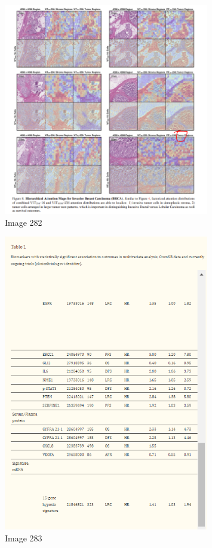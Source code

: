 \documentclass{article}%
\begin{document}
\begin{figure}[h!]%
\centering%
\includegraphics[width=0.8\textwidth]{images/image281.png}%
\caption{Image 282}%
\end{figure}

%


\begin{figure}[h!]%
\centering%
\includegraphics[width=0.8\textwidth]{images/image282.png}%
\caption{Image 283}%
\end{figure}
\end{document}

